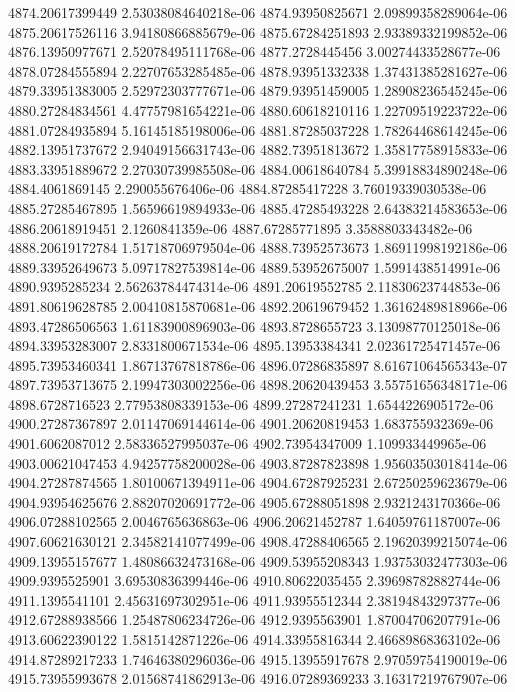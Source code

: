 {4874.20617399449 2.53038084640218e-06
4874.93950825671 2.09899358289064e-06
4875.20617526116 3.94180866885679e-06
4875.67284251893 2.93389332199852e-06
4876.13950977671 2.52078495111768e-06
4877.2728445456 3.00274433528677e-06
4878.07284555894 2.22707653285485e-06
4878.93951332338 1.37431385281627e-06
4879.33951383005 2.52972303777671e-06
4879.93951459005 1.28908236545245e-06
4880.27284834561 4.47757981654221e-06
4880.60618210116 1.22709519223722e-06
4881.07284935894 5.16145185198006e-06
4881.87285037228 1.78264468614245e-06
4882.13951737672 2.94049156631743e-06
4882.73951813672 1.35817758915833e-06
4883.33951889672 2.27030739985508e-06
4884.00618640784 5.39918834890248e-06
4884.4061869145 2.290055676406e-06
4884.87285417228 3.76019339030538e-06
4885.27285467895 1.56596619894933e-06
4885.47285493228 2.64383214583653e-06
4886.20618919451 2.1260841359e-06
4887.67285771895 3.3588803343482e-06
4888.20619172784 1.51718706979504e-06
4888.73952573673 1.86911998192186e-06
4889.33952649673 5.09717827539814e-06
4889.53952675007 1.5991438514991e-06
4890.9395285234 2.56263784474314e-06
4891.20619552785 2.11830623744853e-06
4891.80619628785 2.00410815870681e-06
4892.20619679452 1.36162489818966e-06
4893.47286506563 1.61183900896903e-06
4893.8728655723 3.13098770125018e-06
4894.33953283007 2.8331800671534e-06
4895.13953384341 2.02361725471457e-06
4895.73953460341 1.86713767818786e-06
4896.07286835897 8.61671064565343e-07
4897.73953713675 2.19947303002256e-06
4898.20620439453 3.55751656348171e-06
4898.6728716523 2.77953808339153e-06
4899.27287241231 1.6544226905172e-06
4900.27287367897 2.01147069144614e-06
4901.20620819453 1.683755932369e-06
4901.6062087012 2.58336527995037e-06
4902.73954347009 1.109933449965e-06
4903.00621047453 4.94257758200028e-06
4903.87287823898 1.95603503018414e-06
4904.27287874565 1.80100671394911e-06
4904.67287925231 2.67250259623679e-06
4904.93954625676 2.88207020691772e-06
4905.67288051898 2.9321243170366e-06
4906.07288102565 2.0046765636863e-06
4906.20621452787 1.64059761187007e-06
4907.60621630121 2.34582141077499e-06
4908.47288406565 2.19620399215074e-06
4909.13955157677 1.48086632473168e-06
4909.53955208343 1.93753032477303e-06
4909.9395525901 3.69530836399446e-06
4910.80622035455 2.39698782882744e-06
4911.1395541101 2.45631697302951e-06
4911.93955512344 2.38194843297377e-06
4912.67288938566 1.25487806234726e-06
4912.9395563901 1.87004706207791e-06
4913.60622390122 1.5815142871226e-06
4914.33955816344 2.46689868363102e-06
4914.87289217233 1.74646380296036e-06
4915.13955917678 2.97059754190019e-06
4915.73955993678 2.01568741862913e-06
4916.07289369233 3.16317219767907e-06
}
